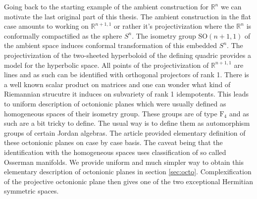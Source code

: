 Going back to the starting example of the ambient construction for $\mathbb{R}^n$ we can motivate the last original part of this thesis. The ambient construction in the flat case amounts to working on $\mathbb{R}^{n+1, 1}$ or rather it's projectivization where the $\mathbb{R}^n$ is conformally compactified as the sphere $S^n.$ The isometry group $\mathrm{SO}(n+1,1)$ of the ambient space induces conformal transformation of this embedded $S^n$. The projectivization of the two-sheeted hyperboloid of the defining quadric provides a model for the hyperbolic space. All points of the projectivization of $\mathbb{R}^{n+1, 1}$ are lines and as such can be identified with orthogonal projectors of rank 1. There is a well known scalar product on matrices and one can wonder what kind of Riemannian strucutre it induces on subvariety of rank 1 idempotents. This leads to uniform description of octonionic planes which were usually defined as homogeneous spaces of their isometry group. These groups are of type $\mathrm{F}_4$ and as such are a bit tricky to define. The usual way is to define them as automorphism groups of certain Jordan algebras. The article \cite{held_semi-riemannian_2009} provided elementary definition of these octonionic planes on case by case basis. The caveat being that the identification with the homogeneous spaces uses classification of so called Osserman manifolds. We provide uniform and much simpler way to obtain this  elementary description of octonionic planes in section \ref{sec:octo}. Complexification of the projective octonionic plane then gives one of the two exceptional Hermitian symmetric spaces.



